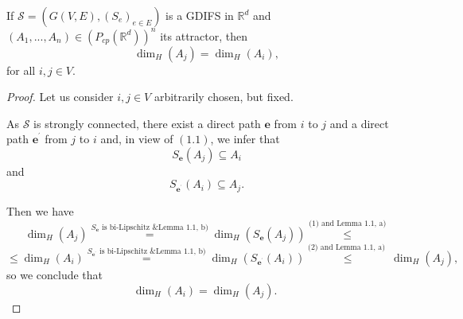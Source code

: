 \documentclass[10pt,a4paper]{amsart}
\begin{document}
\begin{lemma} \label{equaldiem}
    If $\mathcal{S}=(G(V,E),(S_{e})_{e\in E})$ is a GDIFS in $\mathbb{R}^{d}$ and $(A_{1},...,A_{n})\in (P_{cp}(
\mathbb{R}^{d}))^{n}$ its attractor, then
$$\dim _{H}(A_{j})=\dim _{H}(A_{i}),$$
for all $i,j\in V$.
\end{lemma}

\begin{proof}
     Let us consider $i,j\in V$ arbitrarily chosen, but fixed.

As $\mathcal{S}$ is strongly connected, there exist a direct path $\mathbf{e}
$ from $i$ to $j$ and a direct path $\mathbf{e}^{^{\prime }}$ from $j$ to $i$
and, in view of $(1.1)$, we infer that 
\begin{equation}
S_{\mathbf{e}}(A_{j})\subseteq A_{i}  \tag{1}
\end{equation}%
and%
\begin{equation}
S_{\mathbf{e}^{^{\prime }}}(A_{i})\subseteq A_{j}\text{.}  \tag{2}
\end{equation}

Then we have%
\[
\dim _{H}(A_{j})\overset{S_{\mathbf{e}}\text{ is bi-Lipschitz \& Lemma 1.1,
b)}}{=}\dim _{H}(S_{\mathbf{e}}(A_{j}))\overset{\text{(1) and Lemma 1.1, a)}}%
{\leq }
\]%
\[
\leq \dim _{H}(A_{i})\overset{S_{\mathbf{e}^{^{\prime }}}\text{ is
bi-Lipschitz \& Lemma 1.1, b)}}{=}\dim _{H}(S_{\mathbf{e}^{^{\prime
}}}(A_{i}))\overset{\text{(2) and Lemma 1.1, a) }}{\leq }\dim _{H}(A_{j})%
\text{,}
\]%
so we conclude that%
\[
\dim _{H}(A_{i})=\dim _{H}(A_{j})\text{. }
\]

\bigskip 

\end{proof}
\end{document}
